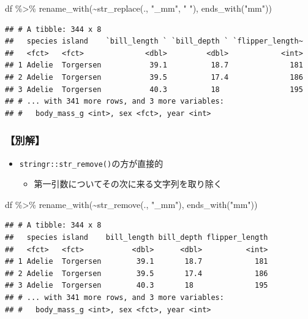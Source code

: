 \documentclass[
  xelatex,ja=standard, b5paper]{bxjsbook}
\newenvironment{Shaded}{\begin{snugshade}}{\end{snugshade}}
\newcommand{\FunctionTok}[1]{\textcolor[rgb]{0.00,0.00,0.00}{#1}}
\newcommand{\NormalTok}[1]{#1}
\newcommand{\SpecialCharTok}[1]{\textcolor[rgb]{0.00,0.00,0.00}{#1}}
\newcommand{\StringTok}[1]{\textcolor[rgb]{0.31,0.60,0.02}{#1}}
\providecommand{\tightlist}{%
  \setlength{\itemsep}{0pt}\setlength{\parskip}{0pt}}
\begin{document}
\begin{Shaded}
\begin{Highlighting}[]
\NormalTok{df }\SpecialCharTok{\%\textgreater{}\%} 
  \FunctionTok{rename\_with}\NormalTok{(}\SpecialCharTok{\textasciitilde{}}\FunctionTok{str\_replace}\NormalTok{(., }\StringTok{"\_mm"}\NormalTok{, }\StringTok{" "}\NormalTok{),}
              \FunctionTok{ends\_with}\NormalTok{(}\StringTok{"mm"}\NormalTok{))}
\end{Highlighting}
\end{Shaded}

\begin{verbatim}
## # A tibble: 344 x 8
##   species island    `bill_length ` `bill_depth ` `flipper_length~
##   <fct>   <fct>              <dbl>         <dbl>            <int>
## 1 Adelie  Torgersen           39.1          18.7              181
## 2 Adelie  Torgersen           39.5          17.4              186
## 3 Adelie  Torgersen           40.3          18                195
## # ... with 341 more rows, and 3 more variables:
## #   body_mass_g <int>, sex <fct>, year <int>
\end{verbatim}

\hypertarget{ux5225ux89e3}{%
\subsubsection{【別解】}\label{ux5225ux89e3}}

\begin{itemize}
\tightlist
\item
  \texttt{stringr::str\_remove()}の方が直接的

  \begin{itemize}
  \tightlist
  \item
    第一引数についてその次に来る文字列を取り除く
  \end{itemize}
\end{itemize}

\begin{Shaded}
\begin{Highlighting}[]
\NormalTok{df }\SpecialCharTok{\%\textgreater{}\%} 
  \FunctionTok{rename\_with}\NormalTok{(}\SpecialCharTok{\textasciitilde{}}\FunctionTok{str\_remove}\NormalTok{(., }\StringTok{"\_mm"}\NormalTok{),}
              \FunctionTok{ends\_with}\NormalTok{(}\StringTok{"mm"}\NormalTok{))}
\end{Highlighting}
\end{Shaded}

\begin{verbatim}
## # A tibble: 344 x 8
##   species island    bill_length bill_depth flipper_length
##   <fct>   <fct>           <dbl>      <dbl>          <int>
## 1 Adelie  Torgersen        39.1       18.7            181
## 2 Adelie  Torgersen        39.5       17.4            186
## 3 Adelie  Torgersen        40.3       18              195
## # ... with 341 more rows, and 3 more variables:
## #   body_mass_g <int>, sex <fct>, year <int>
\end{verbatim}
\end{document}
